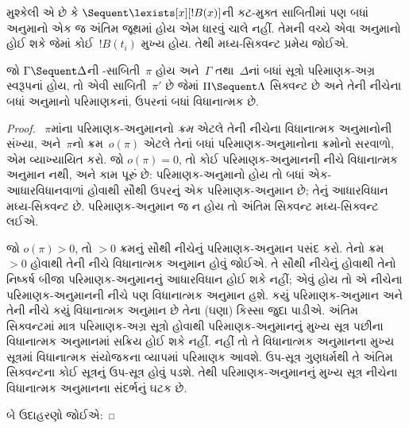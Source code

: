 મુશ્કેલી એ છે કે
$\Sequent \lexists[x][!B(x)]$ની
કટ-મુક્ત સાબિતીમાં પણ
બધાં~\RightR{\lexists}
અનુમાનો એક જ અંતિમ જૂથમાં
હોય એમ ધારવું ચાલે નહીં.
તેમની વચ્ચે એવા અનુમાનો
હોઈ શકે જેમાં કોઈ~$!B(t_i)$
મુખ્ય હોય. તેથી મધ્ય-સિક્વન્ટ
પ્રમેય જોઈએ.

\begin{thm}[મધ્ય-સિક્વન્ટ પ્રમેય]
જો $\Gamma \Sequent \Delta$ની
-સાબિતી~$\pi$ હોય
અને~$\Gamma$ તથા~$\Delta$નાં
બધાં સૂત્રો પરિમાણક-અગ્ર
સ્વરૂપનાં હોય, તો એવી
સાબિતી~$\pi'$ છે જેમાં
$\Pi \Sequent \Lambda$
સિક્વન્ટ છે અને તેની નીચેના
બધાં અનુમાનો પરિમાણકનાં,
ઉપરનાં બધાં વિધાનાત્મક છે.
\end{thm}

\begin{proof}
  ~$\pi$માંના પરિમાણક-અનુમાનનો
  \emph{ક્રમ} એટલે તેની નીચેના
  વિધાનાત્મક અનુમાનોની સંખ્યા,
  અને~$\pi$નો ક્રમ~$o(\pi)$ એટલે
  તેનાં બધાં પરિમાણક-અનુમાનોના
  ક્રમોનો સરવાળો, એમ વ્યાખ્યાયિત કરો.
  જો $o(\pi) = 0$, તો કોઈ
  પરિમાણક-અનુમાનની નીચે
  વિધાનાત્મક અનુમાન નથી,
  અને કામ પૂરું છે:
  પરિમાણક-અનુમાનો હોય તો
  બધાં એક-આધારવિધાનવાળાં હોવાથી
  સૌથી ઉપરનું એક પરિમાણક-અનુમાન
  છે; તેનું આધારવિધાન
  મધ્ય-સિક્વન્ટ છે.
  પરિમાણક-અનુમાન જ ન હોય તો
  અંતિમ સિક્વન્ટ મધ્ય-સિક્વન્ટ લઈએ.

  જો $o(\pi) > 0$, તો
  $>0$ ક્રમનું સૌથી નીચેનું
  પરિમાણક-અનુમાન પસંદ કરો.
  તેનો ક્રમ $>0$ હોવાથી
  તેની નીચે વિધાનાત્મક
  અનુમાન હોવું જોઈએ.
  તે સૌથી નીચેનું હોવાથી
  તેનો નિષ્કર્ષ બીજા
  પરિમાણક-અનુમાનનું આધારવિધાન
  હોઈ શકે નહીં; એવું હોય
  તો એ નીચેના પરિમાણક-અનુમાનની
  નીચે પણ વિધાનાત્મક અનુમાન
  હશે. કયું પરિમાણક-અનુમાન
  અને તેની નીચે કયું વિધાનાત્મક
  અનુમાન છે તેના (ઘણા)
  કિસ્સા જુદા પાડીએ.
  અંતિમ સિક્વન્ટમાં માત્ર
  પરિમાણક-અગ્ર સૂત્રો હોવાથી
  પરિમાણક-અનુમાનનું મુખ્ય
  સૂત્ર પછીના વિધાનાત્મક
  અનુમાનમાં સક્રિય હોઈ
  શકે નહીં. નહીં તો
  તે વિધાનાત્મક અનુમાનના
  મુખ્ય સૂત્રમાં વિધાનાત્મક
  સંયોજકના વ્યાપમાં
  પરિમાણક આવશે.
  ઉપ-સૂત્ર ગુણધર્મથી
  તે અંતિમ સિક્વન્ટના કોઈ
  સૂત્રનું
  ઉપ-સૂત્ર હોવું પડશે.
  તેથી પરિમાણક-અનુમાનનું
  મુખ્ય સૂત્ર નીચેના
  વિધાનાત્મક અનુમાનના સંદર્ભનું
  ઘટક છે.

  બે ઉદાહરણો જોઈએ:


\end{proof}
